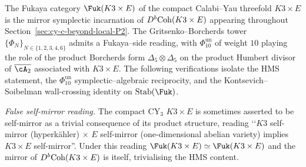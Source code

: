 \begin{remark}
\label{rem:cy-c-beyond-k3e-fukaya-kontsevich-hms-channel}
The Fukaya category $\Fuk(K3\times E)$ of the compact Calabi--Yau
threefold $K3\times E$ is the mirror symplectic incarnation of
$D^b\mathrm{Coh}(K3\times E)$ appearing throughout
Section~\ref{sec:cy-c-beyond-local-P2}. The Gritsenko--Borcherds
tower $\{\Phi_N\}_{N\in\{1,2,3,4,6\}}$ admits a Fukaya--side reading,
with \(\Phi_{10}^{\mathrm{un}}\) of weight $10$ playing the role of the product
Borcherds form $\Delta_5\otimes \Delta_5$ on the product Humbert
divisor of $\overline{\cA_2}$ associated with $K3\times E$. The
following verifications isolate the HMS statement, the \(\Phi_{10}^{\mathrm{un}}\)
symplectic--algebraic reciprocity, and the Kontsevich--Soibelman
wall-crossing identity on $\mathrm{Stab}(\Fuk)$.

\emph{False self-mirror reading.} The compact CY$_3$ $K3\times E$ is
sometimes asserted to be self-mirror as a trivial consequence of its
product structure, reading \lq\lq $K3$ self-mirror
\textup{(}hyperk\"ahler\textup{)} $\times$ $E$ self-mirror
\textup{(}one-dimensional abelian variety\textup{)} implies
$K3\times E$ self-mirror''. Under this reading
$\Fuk(K3\times E)\simeq \Fuk(K3\times E)$ and the mirror of
$D^b\mathrm{Coh}(K3\times E)$ is itself, trivialising the HMS content.


\end{remark}
